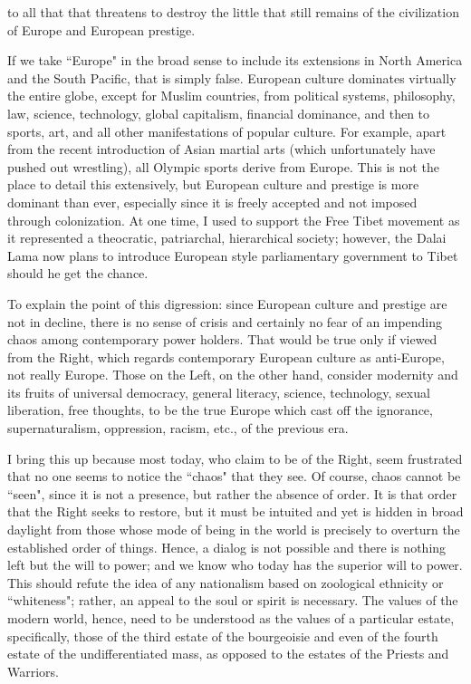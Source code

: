 \begin{quotex}
 to all that that threatens to destroy the little that still remains of the civilization of Europe and European prestige. 

\end{quotex}
If we take ``Europe" in the broad sense to include its extensions in North America and the South Pacific, that is simply false. European culture dominates virtually the entire globe, except for Muslim countries, from political systems, philosophy, law, science, technology, global capitalism, financial dominance, and then to sports, art, and all other manifestations of popular culture. For example, apart from the recent introduction of Asian martial arts (which unfortunately have pushed out wrestling), all Olympic sports derive from Europe. This is not the place to detail this extensively, but European culture and prestige is more dominant than ever, especially since it is freely accepted and not imposed through colonization. At one time, I used to support the Free Tibet movement as it represented a theocratic, patriarchal, hierarchical society; however, the Dalai Lama now plans to introduce European style parliamentary government to Tibet should he get the chance.

To explain the point of this digression: since European culture and prestige are not in decline, there is no sense of crisis and certainly no fear of an impending chaos among contemporary power holders. That would be true only if viewed from the Right, which regards contemporary European culture as anti-Europe, not really Europe. Those on the Left, on the other hand, consider modernity and its fruits of universal democracy, general literacy, science, technology, sexual liberation, free thoughts, to be the true Europe which cast off the ignorance, supernaturalism, oppression, racism, etc., of the previous era.

I bring this up because most today, who claim to be of the Right, seem frustrated that no one seems to notice the ``chaos" that they see. Of course, chaos cannot be ``seen", since it is not a presence, but rather the absence of order. It is that order that the Right seeks to restore, but it must be intuited and yet is hidden in broad daylight from those whose mode of being in the world is precisely to overturn the established order of things. Hence, a dialog is not possible and there is nothing left but the will to power; and we know who today has the superior will to power. This should refute the idea of any nationalism based on zoological ethnicity or ``whiteness"; rather, an appeal to the soul or spirit is necessary. The values of the modern world, hence, need to be understood as the values of a particular estate, specifically, those of the third estate of the bourgeoisie and even of the fourth estate of the undifferentiated mass, as opposed to the estates of the Priests and Warriors.

